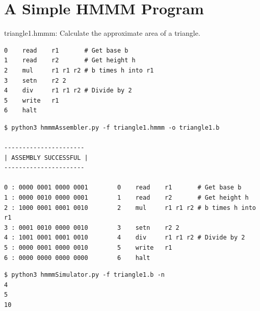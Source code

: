 \documentclass[8pt,a4paper,compress]{beamer}
\begin{document}
\section{A Simple HMMM Program}

\begin{frame}[fragile]
\pause

\begin{framed}
\tiny triangle1.hmmm: Calculate the approximate area of a triangle.
\end{framed}

\begin{lstlisting}[language={}]
0    read    r1       # Get base b
1    read    r2       # Get height h
2    mul     r1 r1 r2 # b times h into r1
3    setn    r2 2
4    div     r1 r1 r2 # Divide by 2
5    write   r1
6    halt
\end{lstlisting}

\pause

\begin{lstlisting}[language={}]
$ python3 hmmmAssembler.py -f triangle1.hmmm -o triangle1.b

----------------------
| ASSEMBLY SUCCESSFUL |
----------------------

0 : 0000 0001 0000 0001        0    read    r1       # Get base b
1 : 0000 0010 0000 0001        1    read    r2       # Get height h
2 : 1000 0001 0001 0010        2    mul     r1 r1 r2 # b times h into r1
3 : 0001 0010 0000 0010        3    setn    r2 2
4 : 1001 0001 0001 0010        4    div     r1 r1 r2 # Divide by 2
5 : 0000 0001 0000 0010        5    write   r1
6 : 0000 0000 0000 0000        6    halt
\end{lstlisting}

\pause

\begin{lstlisting}[language={}]
$ python3 hmmmSimulator.py -f triangle1.b -n
4
5
10
\end{lstlisting}
\end{frame}
\end{document}
